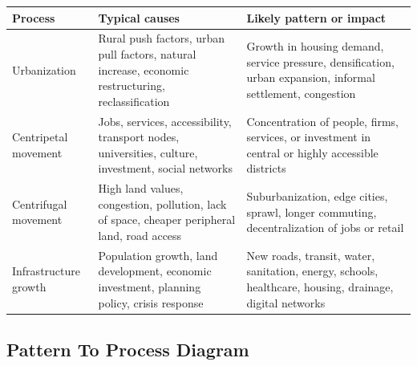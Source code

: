 \documentclass[11pt,a4paper]{article}
\begin{document}
\begin{tabularx}{\textwidth}{L{0.22\textwidth}Y Y}
\toprule
\textbf{Process} & \textbf{Typical causes} & \textbf{Likely pattern or impact} \\
\midrule
Urbanization & Rural push factors, urban pull factors, natural increase,
economic restructuring, reclassification & Growth in housing demand, service
pressure, densification, urban expansion, informal settlement, congestion \\
Centripetal movement & Jobs, services, accessibility, transport nodes,
universities, culture, investment, social networks & Concentration of people,
firms, services, or investment in central or highly accessible districts \\
Centrifugal movement & High land values, congestion, pollution, lack of space,
cheaper peripheral land, road access & Suburbanization, edge cities, sprawl,
longer commuting, decentralization of jobs or retail \\
Infrastructure growth & Population growth, land development, economic
investment, planning policy, crisis response & New roads, transit, water,
sanitation, energy, schools, healthcare, housing, drainage, digital networks \\
\bottomrule
\end{tabularx}

\subsection{Pattern To Process Diagram}

\begin{center}
\end{center}
\end{document}

